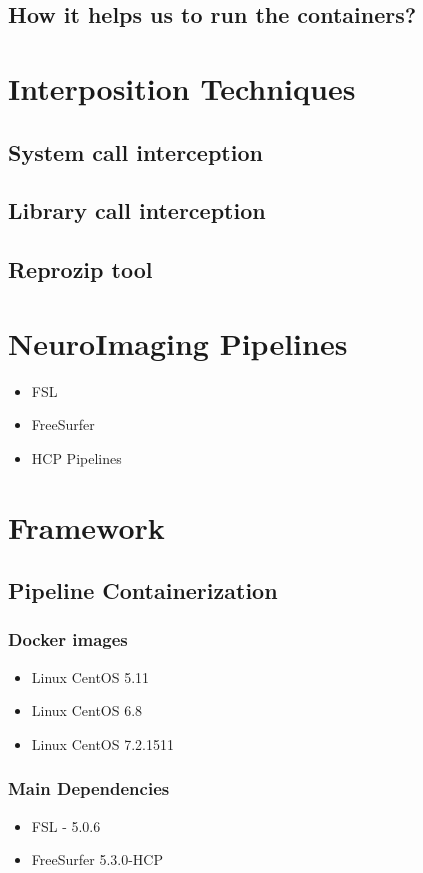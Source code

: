 \subsection{How it helps us to run the containers?}

\section{Interposition Techniques}
\subsection{System call interception}
\subsection{Library call interception}
\subsection{Reprozip tool}

\section{NeuroImaging Pipelines}
\begin{itemize}
 \item FSL
 \item FreeSurfer
 \item HCP Pipelines
\end{itemize}

\section{Framework}
\subsection{Pipeline Containerization}
\subsubsection{Docker images}
\begin{itemize}
  \item Linux CentOS 5.11
  \item Linux CentOS 6.8 
  \item Linux CentOS 7.2.1511
\end{itemize}

\subsubsection{Main Dependencies}
\begin{itemize}
  \item FSL - 5.0.6
  \item FreeSurfer 5.3.0-HCP
\end{itemize}

